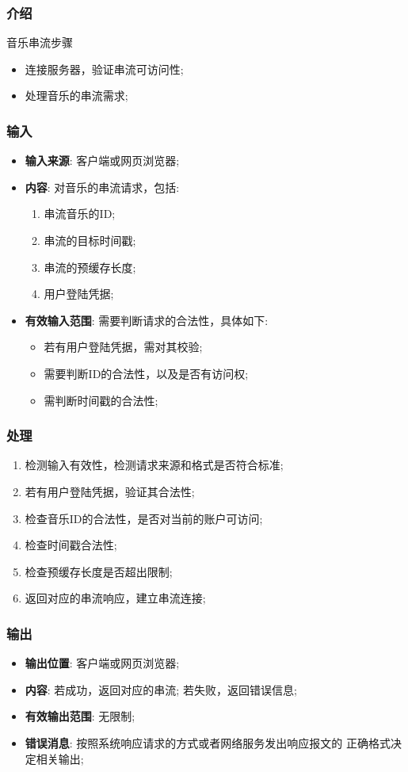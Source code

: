 \subsubsection{介绍}
	音乐串流步骤
	\begin{itemize}
		\item 连接服务器，验证串流可访问性;
		\item 处理音乐的串流需求;
	\end{itemize}
\subsubsection{输入}
	\begin{itemize}
		\item \textbf{输入来源}: 客户端或网页浏览器;
		\item \textbf{内容}: 对音乐的串流请求，包括: 
		\begin{enumerate}
			\item 串流音乐的ID;
			\item 串流的目标时间戳;
			\item 串流的预缓存长度;
			\item 用户登陆凭据;
		\end{enumerate}
		\item \textbf{有效输入范围}: 需要判断请求的合法性，具体如下: 
		\begin{itemize}
			\item 若有用户登陆凭据，需对其校验; 
			\item 需要判断ID的合法性，以及是否有访问权;
			\item 需判断时间戳的合法性; 
		\end{itemize}
	\end{itemize}
\subsubsection{处理}
	\begin{enumerate}
		\item 检测输入有效性，检测请求来源和格式是否符合标准;
		\item 若有用户登陆凭据，验证其合法性;
		\item 检查音乐ID的合法性，是否对当前的账户可访问;
		\item 检查时间戳合法性;
		\item 检查预缓存长度是否超出限制;
		\item 返回对应的串流响应，建立串流连接;
	\end{enumerate}
\subsubsection{输出}
\begin{itemize}
	\item \textbf{输出位置}: 客户端或网页浏览器;
	\item \textbf{内容}: 若成功，返回对应的串流; 若失败，返回错误信息;
	\item \textbf{有效输出范围}: 无限制;
	\item \textbf{错误消息}: 按照系统响应请求的方式或者网络服务发出响应报文的
		正确格式决定相关输出;
\end{itemize}

